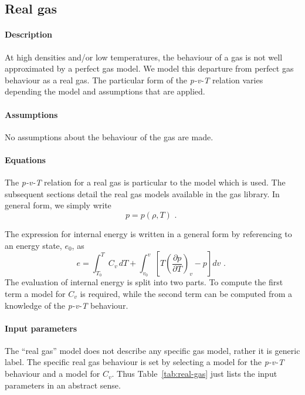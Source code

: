\subsection{Real gas}
\paragraph{Description}
At high densities and/or low temperatures, the behaviour of a gas is not well approximated by a perfect gas model.
We model this departure from perfect gas behaviour as a real gas.
The particular form of the \textit{p-v-T} relation varies depending the
model and assumptions that are applied.

\paragraph{Assumptions}
No assumptions about the behaviour of the gas are made.

\paragraph{Equations}
The \textit{p-v-T} relation for a real gas is particular to the
model which is used.
The subsequent sections detail the real gas models available
in the gas library.
In general form, we simply write
\begin{equation}
 p = p(\rho, T) \text{ . }
\end{equation}

The expression for internal energy is written in a general form
by referencing to an energy state, $e_0$, as
\begin{equation}
e = \int_{T_0}^{T} C_v\,dT + \int_{v_0}^{v} \left[ T\left(\frac{\partial p}{\partial T} \right)_v - p \right] dv \text{ . }
\label{eq:int-e-real}
\end{equation}
The evaluation of internal energy is split into two parts.
To compute the first term a model for $C_v$ is required, while the
second term can be computed from a knowledge of the \textit{p-v-T} 
behaviour.

\paragraph{Input parameters}
The ``real gas'' model does not describe any specific gas model,
rather it is generic label.
The specific real gas behaviour is set by selecting a model
for the \textit{p-v-T} behaviour and a model for $C_v$.
Thus Table~\ref{tab:real-gas} just lists the input parameters
in an abstract sense.

